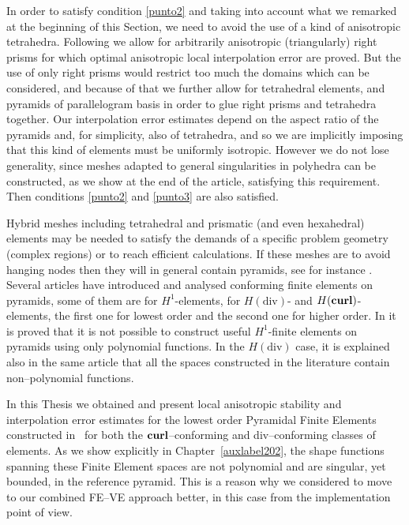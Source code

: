 In order to satisfy condition \ref{punto2} and taking into account what we 
remarked at the beginning of this Section, we need to avoid the use of a kind of anisotropic 
tetrahedra. Following \cite{MR1866274} we allow for arbitrarily anisotropic (triangularly) 
right prisms for which optimal anisotropic local interpolation error are proved. But the 
use of only right prisms would restrict too much the domains which can be considered, 
and because of that we further allow for tetrahedral elements, and pyramids of parallelogram basis
in order to glue right prisms and tetrahedra together. 
Our interpolation error estimates depend on the aspect ratio of the pyramids 
and, for simplicity, also of tetrahedra, and so we are implicitly imposing 
that this kind of elements must be uniformly isotropic. However we do not 
lose generality, since meshes adapted to general singularities in polyhedra can be constructed,
as we show at the end of the article, satisfying this requirement. 
Then conditions \ref{punto2} and \ref{punto3} are also satisfied.  

Hybrid meshes including tetrahedral and prismatic (and even hexahedral) 
elements may be needed to satisfy the demands of a specific problem geometry 
(complex regions) or to reach efficient calculations. If these meshes are 
to avoid hanging nodes then they will in general contain pyramids, see 
for instance \cite{owenSaigal}. Several articles have introduced and analysed 
conforming finite elements on pyramids, some of them are \cite{bergot} for $H^1$-elements, 
\cite{gh99, Nigam-2012} for $H(\mbox{div})$- and $H({\bf curl})$-elements, the first one for 
lowest order and the second one for higher order. 
In \cite{Nigam-2012} it is proved that it is not possible to construct useful $H^1$-finite 
elements on pyramids using only polynomial functions. In the $H(\mbox{div})$ 
case, it is explained also in the same article that all the spaces 
constructed in the literature contain non--polynomial functions.

In this Thesis we obtained and present local anisotropic stability
and interpolation error estimates for the lowest order Pyramidal
Finite Elements constructed in~\cite{gh99, Nigam-2012} for both
the $\textbf{curl}$--conforming and div--conforming classes of elements. As we show
explicitly in Chapter~\ref{auxlabel202}, the shape functions 
spanning these Finite Element spaces are not polynomial and are singular, yet bounded,
in the reference pyramid. This is a reason why we considered to move
to our combined FE--VE approach better, in this case from the implementation
point of view. 

